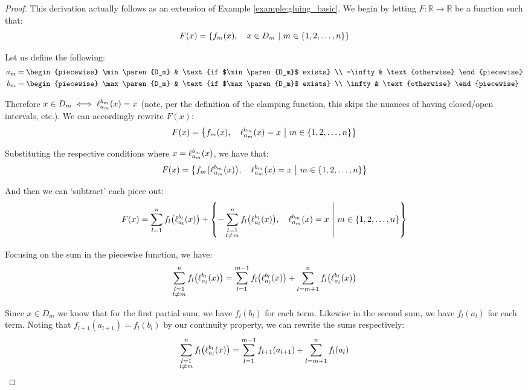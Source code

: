 \begin{proof}
    This derivation actually follows as an extension of Example \ref{example:gluing_basic}. We begin by letting $F:\mathbb{R}\to\mathbb{R}$ be a function such that:
    $$
        F(x) = \left\{f_m(x),\quad x\in D_m\ \middle|\ m\in\{1,2,\dots,n\}\right\}
    $$

    Let us define the following:
    \begin{align*}
        a_m &= \begin{piecewise}
            \min\paren{D_m} & \text{if $\min\paren{D_m}$ exists} \\
            -\infty & \text{otherwise}
        \end{piecewise} \\
        b_m &= \begin{piecewise}
            \max\paren{D_m} & \text{if $\max\paren{D_m}$ exists} \\
            \infty & \text{otherwise}
        \end{piecewise}
    \end{align*}

    Therefore $x\in D_m\iff \ell_{a_m}^{b_m}(x)=x$ (note, per the definition of the clamping function, this skips the nuances of having closed/open intervals, etc.). We can accordingly rewrite $F(x)$:
    $$
        F(x) = \left\{f_m(x),\quad \ell_{a_m}^{b_m}(x)=x\ \middle|\ m\in\{1,2,\dots,n\}\right\}
    $$

    Substituting the respective conditions where $x=\ell_{a_m}^{b_m}(x)$, we have that:
    $$
        F(x) = \pwobj{f_m\paren*{\ell_{a_m}^{b_m}\paren{x}}}{\ell_{a_m}^{b_m}\paren{x}=x}{m\in\br{1,2,\dots,n}}
    $$

    And then we can `subtract' each piece out:
    $$
        F(x) = \sum_{l=1}^{n}{f_l\paren*{\ell_{a_l}^{b_l}\paren{x}}}+\pwobj{-\sum_{\substack{l=1\\l\neq m}}^{n}{f_l\paren*{\ell_{a_l}^{b_l}\paren{x}}}}{\ell_{a_m}^{b_m}\paren{x}=x}{m\in\br{1,2,\dots,n}}
    $$

    Focusing on the sum in the piecewise function, we have:
    $$
        \sum_{\substack{l=1\\l\neq m}}^{n}{f_l\paren*{\ell_{a_l}^{b_l}\paren{x}}} = \sum_{l=1}^{m-1}{f_l\paren*{\ell_{a_l}^{b_l}\paren{x}}}+\sum_{l=m+1}^{n}{f_l\paren*{\ell_{a_l}^{b_l}\paren{x}}}
    $$

    Since $x\in D_m$ we know that for the first partial sum, we have $f_l(b_l)$ for each term. Likewise in the second sum, we have $f_l(a_l)$ for each term. Noting that $f_{l+1}(a_{l+1})=f_l(b_l)$ by our continuity property, we can rewrite the sums respectively:
    $$
        \sum_{\substack{l=1\\l\neq m}}^{n}{f_l\paren*{\ell_{a_l}^{b_l}\paren{x}}} = \sum_{l=1}^{m-1}{f_{l+1}\paren*{a_{l+1}}}+\sum_{l=m+1}^{n}{f_l\paren*{a_l}}
    $$


\end{proof}
